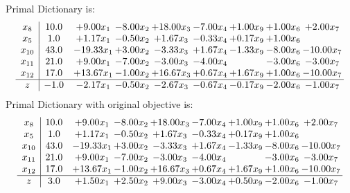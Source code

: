 \documentclass[9pt]{article}
\begin{document}
Primal Dictionary is:
\[\begin{array}{c| c c@{\hskip 2pt} c@{\hskip 2pt} c@{\hskip 2pt} c@{\hskip 2pt} c@{\hskip 2pt} c@{\hskip 2pt} c@{\hskip 2pt} }
 x_{8}   &  10.0 & +  9.00 x_{1} & -8.00 x_{2} & + 18.00 x_{3} & -7.00 x_{4} & +  1.00 x_{9} & +  1.00 x_{6} & +  2.00 x_{7}\\
 x_{5}   &  1.0 & +  1.17 x_{1} & -0.50 x_{2} & +  1.67 x_{3} & -0.33 x_{4} & +  0.17 x_{9} & +  1.00 x_{6} &   \\
 x_{10}   &  43.0 & -19.33 x_{1} & +  3.00 x_{2} & -3.33 x_{3} & +  1.67 x_{4} & -1.33 x_{9} & -8.00 x_{6} & -10.00 x_{7}\\
 x_{11}   &  21.0 & +  9.00 x_{1} & -7.00 x_{2} & -3.00 x_{3} & -4.00 x_{4} &   & -3.00 x_{6} & -3.00 x_{7}\\
 x_{12}   &  17.0 & + 13.67 x_{1} & -1.00 x_{2} & + 16.67 x_{3} & +  0.67 x_{4} & +  1.67 x_{9} & +  1.00 x_{6} & -10.00 x_{7}\\
\hline
z    &  -1.0 & -2.17 x_{1} & -0.50 x_{2} & -2.67 x_{3} & -0.67 x_{4} & -0.17 x_{9} & -2.00 x_{6} & -1.00 x_{7}\\
\end{array}\]
Primal Dictionary with original objective is:
\[\begin{array}{c| c c@{\hskip 2pt} c@{\hskip 2pt} c@{\hskip 2pt} c@{\hskip 2pt} c@{\hskip 2pt} c@{\hskip 2pt} c@{\hskip 2pt} }
 x_{8}   &  10.0 & +  9.00 x_{1} & -8.00 x_{2} & + 18.00 x_{3} & -7.00 x_{4} & +  1.00 x_{9} & +  1.00 x_{6} & +  2.00 x_{7}\\
 x_{5}   &  1.0 & +  1.17 x_{1} & -0.50 x_{2} & +  1.67 x_{3} & -0.33 x_{4} & +  0.17 x_{9} & +  1.00 x_{6} &   \\
 x_{10}   &  43.0 & -19.33 x_{1} & +  3.00 x_{2} & -3.33 x_{3} & +  1.67 x_{4} & -1.33 x_{9} & -8.00 x_{6} & -10.00 x_{7}\\
 x_{11}   &  21.0 & +  9.00 x_{1} & -7.00 x_{2} & -3.00 x_{3} & -4.00 x_{4} &   & -3.00 x_{6} & -3.00 x_{7}\\
 x_{12}   &  17.0 & + 13.67 x_{1} & -1.00 x_{2} & + 16.67 x_{3} & +  0.67 x_{4} & +  1.67 x_{9} & +  1.00 x_{6} & -10.00 x_{7}\\
\hline
z    &  3.0 & +  1.50 x_{1} & +  2.50 x_{2} & +  9.00 x_{3} & -3.00 x_{4} & +  0.50 x_{9} & -2.00 x_{6} & -1.00 x_{7}\\
\end{array}\]
\end{document}
